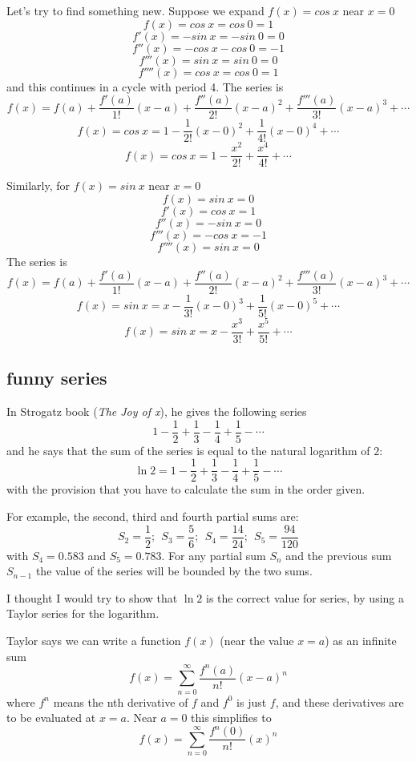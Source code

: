 \documentclass[11pt, oneside]{article}
\begin{document}
Let's try to find something new.  Suppose we expand $f(x) = cos\ x$ near $x=0$
\[ f(x) = cos \ x = cos \ 0 = 1 \]
\[ f'(x) = -sin \ x = -sin \ 0 = 0 \]
\[ f''(x) =  -cos \ x -cos \ 0 = -1 \]
\[ f'''(x) =  sin \ x = sin \ 0 = 0 \]
\[ f''''(x) =  cos \ x =  cos \ 0 = 1 \]
and this continues in a cycle with period 4.
The series is
\[ f(x) = f(a) + \frac{f'(a)}{1!}(x-a) + \frac{f''(a)}{2!}(x-a)^2 + \frac{f'''(a)}{3!}(x-a)^3 + \cdots \]
\[ f(x) = cos \ x = 1 - \frac{1}{2!}(x-0)^2 + \frac{1}{4!}(x-0)^4 + \cdots \]
\[ f(x) = cos \ x = 1 - \frac{x^2}{2!} + \frac{x^4}{4!} + \cdots \]

Similarly, for $f(x) = sin \ x$ near $x=0$
\[ f(x) = sin \ x = 0 \]
\[ f'(x) = cos \ x = 1 \]
\[ f''(x) = -sin \ x = 0 \]
\[ f'''(x) =  -cos \ x = -1 \]
\[ f''''(x) =  sin \ x = 0 \]
The series is
\[ f(x) = f(a) + \frac{f'(a)}{1!}(x-a) + \frac{f''(a)}{2!}(x-a)^2 + \frac{f'''(a)}{3!}(x-a)^3 + \cdots \]
\[ f(x) = sin \ x = x - \frac{1}{3!}(x-0)^3 + \frac{1}{5!}(x-0)^5 + \cdots \]
\[ f(x) = sin \ x = x - \frac{x^3}{3!} + \frac{x^5}{5!} + \cdots \]

\subsection*{funny series}

In Strogatz book (\emph{The Joy of x}), he gives the following series
\[ 1 - \frac{1}{2} + \frac{1}{3} - \frac{1}{4} + \frac{1}{5} - \cdots \]
and he says that the sum of the series is equal to the natural logarithm of $2$:
\[ \ln 2 = 1 - \frac{1}{2} + \frac{1}{3} - \frac{1}{4} + \frac{1}{5} - \cdots \]
with the provision that you have to calculate the sum in the order given.

For example, the second, third and fourth partial sums are:
\[ S_2 = \frac{1}{2} ; \ \  S_3 = \frac{5}{6}; \ \ S_4 = \frac{14}{24}; \ \ S_5 = \frac{94}{120} \]
with $S_4 = 0.583$ and $S_5 = 0.783$.  For any partial sum $S_n$ and the previous sum $S_{n-1}$ the value of the series will be bounded by the two sums.

I thought I would try to show that $\ln 2$ is the correct value for series, by using a Taylor series for the logarithm.  

Taylor says we can write a function $f(x)$ (near the value $x=a$) as an infinite sum
\[ f(x) = \sum_{n=0}^\infty \frac{f^n(a)}{n!} (x-a)^n\]
where $f^n$ means the nth derivative of $f$ and $f^0$ is just $f$, and these derivatives are to be evaluated at $x=a$.
Near $a=0$ this simplifies to 
\[ f(x) = \sum_{n=0}^\infty \frac{f^n(0)}{n!} (x)^n\]
\end{document}
